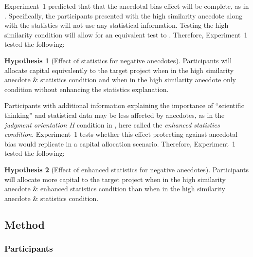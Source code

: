 \documentclass[a4paper, nobind, dvipsnames]{templates/ociamthesis}
\theoremstyle{definition}
\theoremstyle{definition}
\theoremstyle{definition}
\theoremstyle{definition}
\newtheorem{hypothesis}{Hypothesis}[chapter]
\theoremstyle{remark}
\begin{document}
Experiment~1 predicted that that the anecdotal bias effect will be complete, as
in \textcite{wainberg2013}. Specifically, the participants presented with the high
similarity anecdote along with the statistics will not use any statistical
information. Testing the high similarity condition will allow for an equivalent
test to \textcite{wainberg2013}. Therefore, Experiment~1 tested the following:

\begin{hypothesis}[Effect of statistics for negative anecdotes]
\protect\hypertarget{hyp:statistics-anecdotes-1}{}{\label{hyp:statistics-anecdotes-1} {} }Participants will allocate capital equivalently to the target project when in
the high similarity anecdote \& statistics condition and when in the high
similarity anecdote only condition without enhancing the statistics explanation.
\end{hypothesis}

Participants with additional information explaining the importance of
``scientific thinking'' and statistical data may be less affected by anecdotes, as
in the \emph{judgment orientation II} condition in \textcite{wainberg2018}, here called the
\emph{enhanced statistics condition}. Experiment~1 tests whether this effect
protecting against anecdotal bias would replicate in a capital allocation
scenario. Therefore, Experiment~1 tested the following:

\begin{hypothesis}[Effect of enhanced statistics for negative anecdotes]
\protect\hypertarget{hyp:enhanced-statistics-anecdotes-1}{}{\label{hyp:enhanced-statistics-anecdotes-1} {} }Participants will allocate more capital to the target project when in the high
similarity anecdote \& enhanced statistics condition than when in the high
similarity anecdote \& statistics condition.
\end{hypothesis}

\hypertarget{method-anecdotes-1}{%
\subsection{Method}\label{method-anecdotes-1}}

\subsubsection{Participants}
\end{document}

